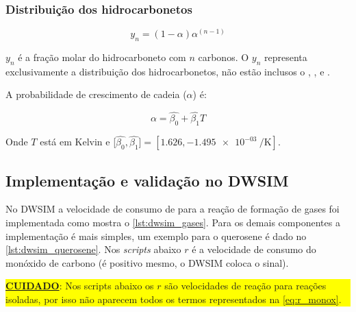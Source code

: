 \documentclass[portuguese,12pt,a4paper,onecolumn]{article}
\begin{document}
	\subsubsection{Distribuição dos hidrocarbonetos}
	
	\begin{equation}
		y_n = (1 - \alpha) \alpha^{(n - 1)}
		\label{eq:alpha_2}
	\end{equation}
	
	$y_n$ é a fração molar do hidrocarboneto com $n$ carbonos. O $y_n$ representa exclusivamente a distribuição dos hidrocarbonetos, não estão inclusos o , ,  e .
	
	A probabilidade de crescimento de cadeia ($\alpha$) é:
	
	\begin{equation}
		\alpha = \hat{\beta_0} + \hat{\beta_1} T
	\end{equation}
	
	Onde $T$ está em Kelvin e [$\hat{\beta_0}, \hat{\beta_1}] = [\num{1.626}, \qty{-1.495e-03}{\per \kelvin}]$.
	
	\subsection{Implementação e validação no DWSIM}
	
	No DWSIM a velocidade de consumo de  para a reação de formação de gases foi implementada como mostra o \autoref{lst:dwsim_gases}. Para os demais componentes a implementação é mais simples, um exemplo para o querosene é dado no \autoref{lst:dwsim_querosene}. Nos \textit{scripts} abaixo $r$  é a velocidade de consumo do monóxido de carbono (é positivo mesmo, o DWSIM coloca o sinal).
	
	\colorbox{yellow}{\parbox{\textwidth}{
			\textbf{\underline{CUIDADO}}: Nos scripts abaixo os $r$ são velocidades de reação para reações isoladas, por isso não aparecem todos os termos representados na \autoref{eq:r_monox}.
	}}
	
\end{document}
